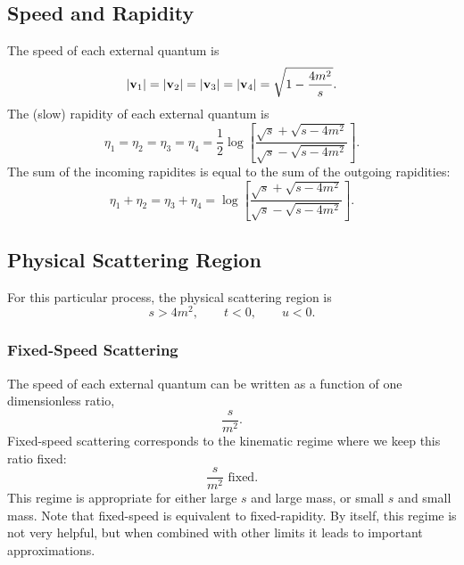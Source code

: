 \subsection{Speed and Rapidity}
The speed of each external quantum is
\begin{equation}
	\left\lvert \mathbf{v}_{1} \right\rvert = \left\lvert \mathbf{v}_{2} \right\rvert = \left\lvert \mathbf{v}_{3} \right\rvert = \left\lvert \mathbf{v}_{4} \right\rvert = \sqrt{1 - \frac{4 m^{2}}{s}}.
\end{equation}
The (slow) rapidity of each external quantum is
\begin{equation}
	\eta_{1} = \eta_{2} = \eta_{3} = \eta_{4} = \frac{1}{2} \log{\left[\frac{\sqrt{s} + \sqrt{s - 4 m^{2}}}{\sqrt{s} - \sqrt{s - 4 m^{2}}}\right]}.
\end{equation}
The sum of the incoming rapidites is equal to the sum of the outgoing rapidities:
\begin{equation}
	\eta_{1} + \eta_{2} = \eta_{3} + \eta_{4} = \log{\left[\frac{\sqrt{s} + \sqrt{s - 4 m^{2}}}{\sqrt{s} - \sqrt{s - 4 m^{2}}}\right]}.
\end{equation}
\subsection{Physical Scattering Region}
For this particular process, the physical scattering region is
\begin{equation}
	s > 4m^2, \qquad t < 0, \qquad u < 0.
\end{equation}
\subsubsection{Fixed-Speed Scattering}
The speed of each external quantum can be written as a function of one dimensionless ratio,
\begin{equation}
	\frac{s}{m^{2}}.
\end{equation}
Fixed-speed scattering corresponds to the kinematic regime where we keep this ratio fixed:
\begin{equation}
	\frac{s}{m^{2}} \text{ fixed}.
\end{equation}
This regime is appropriate for either large $s$ and large mass, or small $s$ and small mass. Note that fixed-speed is equivalent to fixed-rapidity. By itself, this regime is not very helpful, but when combined with other limits it leads to important approximations.
